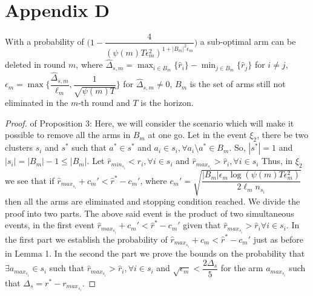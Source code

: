 \section*{Appendix D}
\begin{proposition}
With a probability of $\bigg(1-\dfrac{4}{(\psi(m)T\epsilon_{m}^{2})^{1+|B_{m}|^{2}\epsilon_{m}}}\bigg)$ a sub-optimal arm can be deleted in round $m$, where $\hat{\Delta}_{s,m}=\max_{i\in B_{m}}{\lbrace\hat{r}_{i}\rbrace}-\min_{j\in B_{m}}{\lbrace\hat{r}_{j}\rbrace}$ for $i\neq j$,  $\epsilon_{m}=\max{\bigg\lbrace\dfrac{\hat{\Delta}_{s,m}}{\ell_{m}}, \dfrac{1}{\sqrt{\psi{(m)T}}}\bigg\rbrace}$ for $\hat{\Delta}_{s,m}\neq 0$, $B_{m}$ is the set of arms still not eliminated in the $m$-th round and $T$ is the horizon.
\end{proposition}

\begin{proof} of Proposition 3:
\newline
Here, we will consider the scenario which will make it possible to remove all the arms in $B_{m}$ at one go. Let in the event $\xi_{2}$, there be two clusters $s_{i}$ and $s^{*}$ such that $a^{*}\in s^{*}$ and $a_{i}\in s_{i}, \forall a_{i}\setminus a^{*}\in B_{m}$. So, $|s^{*}|=1$ and $|s_{i}|=|B_{m}|-1\leq |B_{m}|$. Let $\hat{r}_{min_{s_{i}}}<\hat{r}_{i},\forall i\in s_{i}$ and $\hat{r}_{max_{s_{i}}}>\hat{r}_{i},\forall i\in s_{i}$ Thus, in $\xi_{2}$ we see that if
\newline
\hspace*{2em} $\hat{r}_{max_{s_{i}}}+c_{m}' < \hat{r}^{*}-c_{m}' $, where $c_{m}'=\sqrt{\dfrac{|B_{m}|\epsilon_{m}\log{(\psi(m)T\epsilon_{m}^{2})}}{2\ell_{m} n_{s_{i}}}}$
\newline
then all the arms are eliminated and stopping condition reached. 
We divide the proof into two parts. The above said event is the product of two simultaneous events, in the first event $\hat{r}_{max_{s_{i}}}+c_{m}' < \hat{r}^{*}-c_{m}'$ given that $\hat{r}_{max_{s_{i}}}>\hat{r}_{i}\forall i \in s_{i}$. In the first part we establish the probability of $\hat{r}_{max_{s_{i}}}+c_{m} < \hat{r}^{*}-c_{m}'$ just as before in Lemma 1. In the second the part we prove the bounds on the probability that $\exists a_{max_{s_{i}}}\in s_{i}$ such that $\hat{r}_{max_{s_{i}}}>\hat{r}_{i},\forall i \in s_{i}$ and $\sqrt{\epsilon_{m}}<\dfrac{2\Delta_{s}}{5}$ for the arm $a_{max_{s_{i}}}$ such that $\Delta_{s}=r^{*}-r_{max_{s_{i}}}$.

\end{proof}

